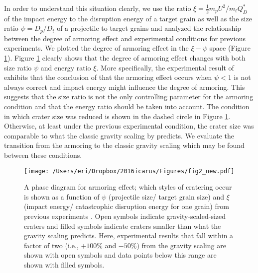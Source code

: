 \documentclass[3p,authoryear]{elsarticle}
\begin{document}
In order to understand this situation clearly, we use the ratio  $\xi =\frac{1}{2}m_pU^2/m_tQ_D^*$ of the impact energy to the disruption energy of a target grain as well as the size ratio $\psi=D_p/D_t$ of a projectile to target grains and analyzed the relationship between the degree of armoring effect and experimental conditions for previous experiments. We plotted the degree of armoring effect in the $\xi - \psi$ space (Figure \ref{phase}). Figure \ref{phase} clearly shows that the degree of armoring effect changes with both size ratio $\psi$ and energy ratio $\xi$.
More specifically, the experimental result of \citet{holsapple2014} exhibits that the conclusion of \citet{guettler2012} that the armoring effect occurs when $\psi<1$ is not always correct and impact energy might influence the degree of armoring.
This suggests that the size ratio is not the only controlling parameter for the armoring condition and that the energy ratio should be taken into account.
The condition in which crater size was reduced is shown in the dashed circle in Figure \ref{phase}. Otherwise, at least under the previous experimental condition, the crater size was comparable to what the classic gravity scaling by \citet{holsapple1993} predicts.
We evaluate the transition from the armoring to the classic gravity scaling which may be found between these conditions.
\begin{figure}[htbp]
\begin{center}
	\texttt{[image: /Users/eri/Dropbox/2016icarus/Figures/fig2\_new.pdf]}
	\caption{A phase diagram for armoring effect; which styles of cratering occur is shown as a function of $\psi$ (projectile size/ target grain size) and $\xi$ (impact energy/ catastrophic disruption energy for one grain) from previous experiments \citep{cintala1999,guettler2012,holsapple2014}. Open symbols indicate gravity-scaled-sized craters \citep{holsapple1993} and filled symbols indicate craters smaller than what the gravity scaling predicts. Here, experimental results that fall within a factor of two (i.e., $+100\%$ and $-50\%$) from the gravity scaling are shown with open symbols and data points below this range are shown with filled symbols.}
	\label{phase}
\end{center}
\end{figure}
\end{document}
